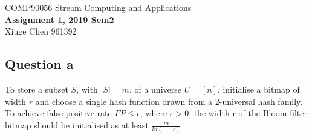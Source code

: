 \documentclass[12pt]{article}
\begin{document}
\begin{center}
{\sc COMP90056 Stream Computing and Applications}
\bigskip \\
{\Large\bf Assignment 1, 2019 Sem2}
\bigskip \\
{\large Xiuge Chen 961392}
\end{center}

\subsection*{Question a}
To store a subset $S$, with $|S| = m$, of a universe $U = [n]$, initialise a bitmap of width $r$ and choose a single hash function drawn from a 2-universal hash family. To achieve false positive rate $FP \leq \epsilon$, where $\epsilon > 0$, the width r of the Bloom filter bitmap should be initialised as at least $\frac{m}{ln(1 - \epsilon)}$
\end{document}
